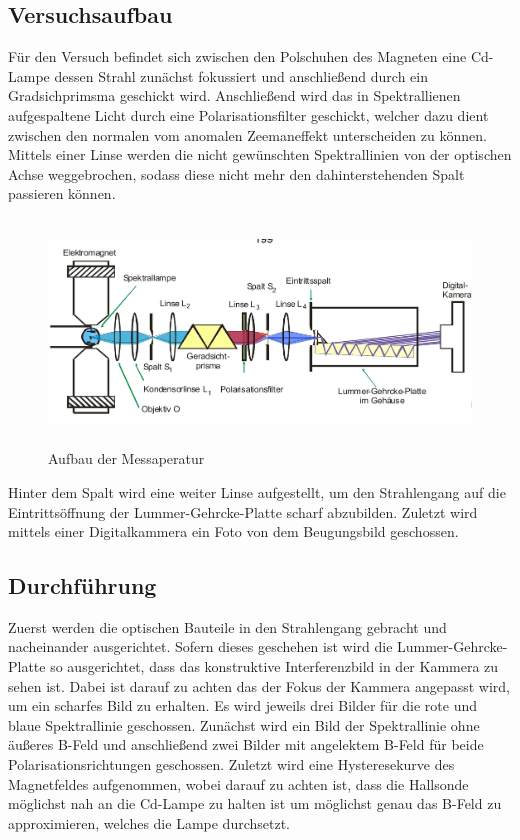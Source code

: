 \subsection{Versuchsaufbau}
Für den Versuch befindet sich zwischen den Polschuhen des Magneten eine Cd-Lampe dessen Strahl zunächst fokussiert und anschließend durch ein Gradsichprimsma geschickt wird. Anschließend wird das in Spektrallienen aufgespaltene Licht durch eine Polarisationsfilter geschickt, welcher dazu dient zwischen den normalen vom anomalen Zeemaneffekt unterscheiden zu können. Mittels einer Linse werden die nicht gewünschten Spektrallinien von der optischen Achse weggebrochen, sodass diese nicht mehr den dahinterstehenden Spalt passieren können. 
\begin{figure}[H]
  \centering
  \includegraphics[height=6cm]{Bilder/Aufbau.png}
  \caption{Aufbau der Messaperatur \cite{V27}}
  \label{fig:<+label+>}
\end{figure}
Hinter dem Spalt wird eine weiter Linse aufgestellt, um den Strahlengang auf die Eintrittsöffnung der Lummer-Gehrcke-Platte scharf abzubilden. Zuletzt wird mittels einer Digitalkammera ein Foto von dem Beugungsbild geschossen.

\subsection{Durchführung}
Zuerst werden die optischen Bauteile in den Strahlengang gebracht und nacheinander ausgerichtet. Sofern dieses geschehen ist wird die Lummer-Gehrcke-Platte so ausgerichtet, dass das konstruktive Interferenzbild in der Kammera zu sehen ist. Dabei ist darauf zu achten das der Fokus der Kammera angepasst wird, um ein scharfes Bild zu erhalten. Es wird jeweils drei Bilder für die rote und blaue Spektrallinie geschossen. Zunächst wird ein Bild der Spektrallinie ohne äußeres B-Feld und anschließend zwei Bilder mit angelektem B-Feld für beide Polarisationsrichtungen geschossen. Zuletzt wird eine Hysteresekurve des Magnetfeldes aufgenommen, wobei darauf zu achten ist, dass die Hallsonde möglichst nah an die Cd-Lampe zu halten ist um möglichst genau das B-Feld zu approximieren, welches die Lampe durchsetzt.
